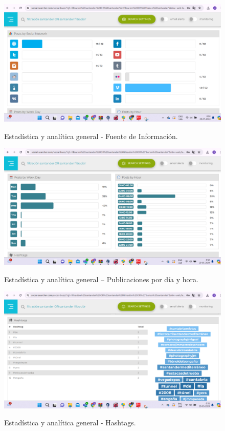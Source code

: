 \documentclass[stu, 11pt, letterpaper, donotrepeattitle, floatsintext, natbib]{apa7}
\begin{document}
\begin{figure}[H]
\centering
\caption{Estadística y analítica general - Fuente de Información.}
\includegraphics[width=0.75\linewidth]{osi18.png} %
\label{fig:OverallEffect}
\end{figure}

\begin{figure}[H]
\centering
\caption{Estadística y analítica general – Publicaciones por día y hora.}
\includegraphics[width=0.75\linewidth]{osi19.png} %
\label{fig:OverallEffect}
\end{figure}

\begin{figure}[H]
\centering
\caption{Estadística y analítica general - Hashtags.}
\includegraphics[width=0.75\linewidth]{osi20.png} %
\label{fig:OverallEffect}
\end{figure}
\end{document}
